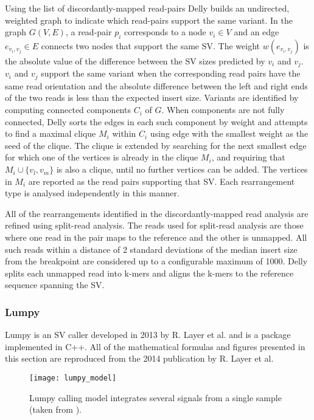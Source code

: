 Using the list of discordantly-mapped read-pairs Delly builds an undirected, weighted graph to indicate which read-pairs support the same variant. In the graph $G(V,E)$, a read-pair $p_i$ corresponds to a node $v_i \in V$ and an edge $e_{v_i,v_j} \in E$ connects two nodes that support the same SV. The weight $w(e_{v_i,v_j})$ is the absolute value of the difference between the SV sizes predicted by $v_i$ and $v_j$. $v_i$ and $v_j$ support the same variant when the corresponding read pairs have the same read orientation and the absolute difference between the left and right ends of the two reads is less than the expected insert size. Variants are identified by computing connected components $C_i$ of $G$. When components are not fully connected, Delly sorts the edges in each such component by weight and attempts to find a maximal clique $M_i$ within $C_i$ using edge with the smallest weight as the seed of the clique. The clique is extended by searching for the next smallest edge for which one of the vertices is already in the clique $M_i$, and requiring that $M_i \cup \{v_l,v_m\}$ is also a clique, until no further vertices can be added. The vertices in $M_i$ are reported as the read pairs supporting that SV. Each rearrangement type is analysed independently in this manner.

All of the rearrangements identified in the discordantly-mapped read analysis are refined using split-read analysis. The reads used for split-read analysis are those where one read in the pair maps to the reference and the other is unmapped. All such reads within a distance of 2 standard deviations of the median insert size from the breakpoint are considered up to a configurable maximum of 1000. Delly splits each unmapped read into k-mers and aligns the k-mers to the reference sequence spanning the SV.

\subsubsection{Lumpy}

Lumpy\autocite{layer2014lumpy} is an SV caller developed in 2013 by R. Layer et al. and is a package implemented in C++. All of the mathematical formulas and figures presented in this section are reproduced from the 2014 publication by R. Layer et al. 

\begin{figure}[H]
    \texttt{[image: lumpy\_model]}
    \centering
    \caption {Lumpy calling model integrates several signals from a single sample (taken from \autocite{layer2014lumpy}).}
    \label{fig:lumpy_model}
\end{figure}

